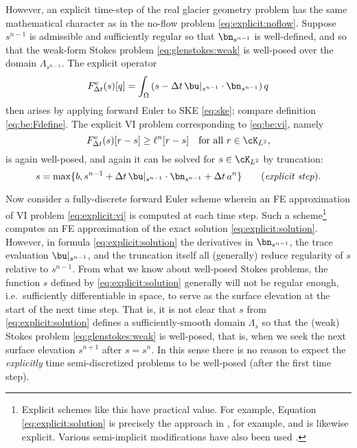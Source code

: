 However, an explicit time-step of the real glacier geometry problem has the same mathematical character as in the no-flow problem \eqref{eq:explicit:noflow}.  Suppose $s^{n-1}$ is admissible and sufficiently regular so that $\bn_{s^{n-1}}$ is well-defined, and so that the weak-form Stokes problem \eqref{eq:glenstokes:weak} is well-posed over the domain $\Lambda_{s^{n-1}}$.  The explicit operator
\begin{equation}
F^{\text{e}}_{\Delta t}(s)[q] = \int_\Omega \left(s - \Delta t\, \bu|_{s^{n-1}} \cdot \bn_{s^{n-1}}\right) q  \label{eq:explicitFdefine}
\end{equation}
then arises by applying forward Euler to SKE \eqref{eq:ske}; compare definition \eqref{eq:be:Fdefine}.  The explicit VI problem corresponding to \eqref{eq:be:vi}, namely
\begin{equation}
F^{\text{e}}_{\Delta t}(s)[r-s] \ge \ell^n[r-s] \quad \text{for all } r \in \cK_{L^2}, \label{eq:explicit:vi}
\end{equation}
is again well-posed, and again it can be solved for $s \in \cK_{L^2}$ by truncation:
\begin{equation}
s = \max\{b, s^{n-1} + \Delta t\, \bu|_{s^{n-1}} \cdot \bn_{s^{n-1}} + \Delta t\,a^n\} \qquad (\text{\emph{explicit step}}). \label{eq:explicit:solution}
\end{equation}

Now consider a fully-discrete forward Euler scheme wherein an FE approximation of VI problem \eqref{eq:explicit:vi} is computed at each time step.  Such a scheme\footnote{Explicit schemes like this have practical value.  For example, Equation \eqref{eq:explicit:solution} is precisely the approach in \cite{Lengetal2012}, for example, and \cite{Jouvetetal2008} is likewise explicit.  Various semi-implicit modifications have also been used \cite{Chengetal2020,Durandetal2009,LofgrenAhlkronaHelanow2022,WirbelJarosch2020}.} computes an FE approximation of the exact solution \eqref{eq:explicit:solution}.  However, in formula \eqref{eq:explicit:solution} the derivatives in $\bn_{s^{n-1}}$, the trace evaluation $\bu|_{s^{n-1}}$, and the truncation itself all (generally) reduce regularity of $s$  relative to $s^{n-1}$.  From what we know about well-posed Stokes problems, the function $s$ defined by \eqref{eq:explicit:solution} generally will not be regular enough, i.e.~sufficiently differentiable in space, to serve as the surface elevation at the start of the next time step.  That is, it is not clear that $s$ from \eqref{eq:explicit:solution} defines a sufficiently-smooth domain $\Lambda_s$ so that the (weak) Stokes problem \eqref{eq:glenstokes:weak} is well-posed, that is, when we seek the next surface elevation $s^{n+1}$ after $s=s^n$.  In this sense there is no reason to expect the \emph{explicitly} time semi-discretized problems to be well-posed (after the first time step).

